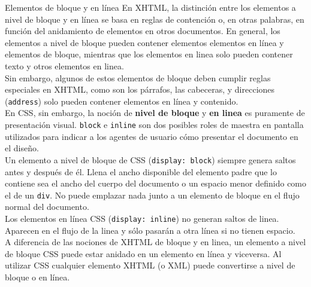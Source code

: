 \begin{frame}[allowframebreaks]{Elementos de bloque y en línea} %
    En XHTML, la distinción entre los elementos a nivel de bloque y en línea se
    basa en reglas de contención o, en otras palabras, en función del
    anidamiento de elementos en otros documentos. En general, los elementos a
    nivel de bloque pueden contener elementos elementos en línea y elementos de
    bloque, mientras que los elementos en linea solo pueden contener texto y
    otros elementos en linea. \\[0.2cm]

    Sin embargo, algunos de estos elementos de bloque deben cumplir reglas
    especiales en XHTML, como son los párrafos, las cabeceras, y direcciones
    (\texttt{address}) solo pueden contener elementos en línea y contenido.\\[0.5cm]

    En CSS, sin embargo, la noción de \textbf{nivel de bloque} y \textbf{en
    linea}  es puramente de presentación visual. \texttt{block} e
    \texttt{inline} son dos posibles roles de maestra en pantalla utilizados
    para indicar a los agentes de usuario cómo presentar el documento en el
    diseño. \\[0.5cm]

    Un elemento a nivel de bloque de CSS (\texttt{display: block}) siempre
    genera saltos antes y después de él. Llena el ancho disponible del elemento
    padre que lo contiene sea el ancho del cuerpo del documento o un espacio
    menor definido como el de un \texttt{div}. No puede emplazar nada junto a
    un elemento de bloque en el flujo normal del documento. \\[0.5cm]

    Los elementos en línea CSS (\texttt{display: inline}) no generan saltos de
    linea. Aparecen en el flujo de la linea y sólo pasarán a otra línea si no
    tienen espacio. \\[0.5cm]

    A diferencia de las nociones de XHTML de bloque y en linea, un elemento a
    nivel de bloque CSS puede estar anidado en un elemento en línea y
    viceversa. Al utilizar CSS cualquier elemento XHTML (o XML) puede
    convertirse a nivel de bloque o en línea. 

\end{frame}


